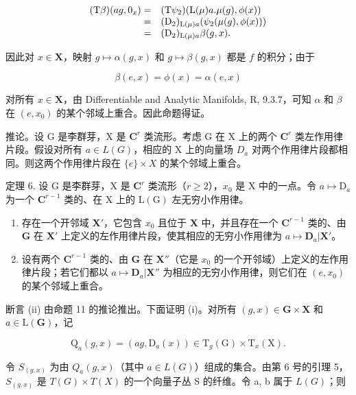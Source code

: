 \[
\begin{array}{r l} (\mathrm{T} \beta) (a g, 0 _ {x}) = & (\mathrm{T} \psi_ {2}) (\mathrm{L} (\mu) a. \mu (g), \phi (x)) \\ = & (\mathrm{D} _ {2}) _ {\mathrm{L} (\mu) a} (\psi_ {2} (\mu (g), \phi (x))) \\ = & (\mathrm{D} _ {2}) _ {\mathrm{L} (\mu) a} \beta (g, x). \end{array}
\]

因此对 \(x \in \mathbf{X}\)，映射 \(g \mapsto \alpha(g, x)\) 和 \(g \mapsto \beta(g, x)\) 都是 \(f\) 的积分；由于

\[
\beta (e, x) = \phi (x) = \alpha (e, x)
\]

对所有 \(x \in \mathbf{X}\)，由 Differentiable and Analytic Manifolds, R, 9.3.7，可知 \(\alpha\) 和 \(\beta\) 在 \((e, x_0)\) 的某个邻域上重合。因此命题得证。

推论。设 G 是李群芽，X 是 \(\mathbf{C}^{r}\) 类流形。考虑 G 在 X 上的两个 \(\mathbf{C}^{r}\) 类左作用律片段。假设对所有 \(a \in L(G)\)，相应的 X 上的向量场 \(D_{a}\) 对两个作用律片段都相同。则这两个作用律片段在 \(\{e\} \times X\) 的某个邻域上重合。

定理 6. 设 G 是李群芽，X 是 \(\mathbf{C}^r\) 类流形（\(r \geqslant 2\)），\(x_0\) 是 X 中的一点。令 \(a \mapsto \mathrm{D}_a\) 为一个 \(\mathbf{C}^{r-1}\) 类的、在 X 上的 \(\mathrm{L(G)}\) 左无穷小作用律。

\begin{enumerate}
\def\labelenumi{(\roman{enumi})}
\item
  存在一个开邻域 \(\mathbf{X}'\)，它包含 \(x_0\) 且位于 \(\mathbf{X}\) 中，并且存在一个 \(\mathbf{C}^{r-1}\) 类的、由 \(\mathbf{G}\) 在 \(\mathbf{X}'\) 上定义的左作用律片段，使其相应的无穷小作用律为 \(a \mapsto \mathbf{D}_a|\mathbf{X}'\)。
\item
 设有两个 \(\mathbf{C}^{r-1}\) 类的、由 \(\mathbf{G}\) 在 \(\mathbf{X}''\)（它是 \(x_0\) 的一个开邻域）上定义的左作用律片段；若它们都以 \(a \mapsto \mathbf{D}_a|\mathbf{X}''\) 为相应的无穷小作用律，则它们在 \((e, x_0)\) 的某个邻域上重合。
\end{enumerate}

断言 (ii) 由命题 11 的推论推出。下面证明 (i)。对所有 \((g, x) \in \mathbf{G} \times \mathbf{X}\) 和 \(a \in \mathrm{L}(\mathbf{G})\)，记

\[
\mathrm{Q} _ {a} (g, x) = (a g, \mathrm{D} _ {a} (x)) \in \mathrm{T} _ {g} (\mathrm{G}) \times \mathrm{T} _ {x} (\mathrm{X}).
\]

令 \(S_{(g,x)}\) 为由 \(Q_{a}(g,x)\)（其中 \(a\in L(G)\)）组成的集合。由第 6 号的引理 5，\(S_{(g,x)}\) 是 \(T(G)\times T(X)\) 的一个向量子丛 S 的纤维。令 a, b 属于 \(L(G)\)；则

